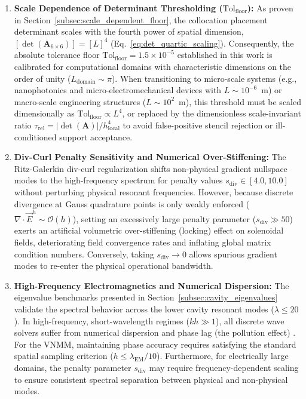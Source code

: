 \documentclass[preprint,12pt]{elsarticle}
\begin{document}
\begin{enumerate}
    \item \textbf{Scale Dependence of Determinant Thresholding ($\mathrm{Tol}_{\mathrm{floor}}$):} 
    As proven in Section~\ref{subsec:scale_dependent_floor}, the collocation placement determinant scales with the fourth power of spatial dimension, $[\det(\mathbf{A}_{6 \times 6})] = [L]^4$ (Eq.~\eqref{eq:det_quartic_scaling}). Consequently, the absolute tolerance floor $\mathrm{Tol}_{\mathrm{floor}} = 1.5 \times 10^{-5}$ established in this work is calibrated for computational domains with characteristic dimensions on the order of unity ($L_{\mathrm{domain}} \sim \pi$). When transitioning to micro-scale systems (e.g., nanophotonics and micro-electromechanical devices with $L \sim 10^{-6}$~m) or macro-scale engineering structures ($L \sim 10^2$~m), this threshold must be scaled dimensionally as $\mathrm{Tol}_{\mathrm{floor}} \propto L^4$, or replaced by the dimensionless scale-invariant ratio $\tau_{\mathrm{rel}} = |\det(\mathbf{A})| / h_{\mathrm{local}}^4$ to avoid false-positive stencil rejection or ill-conditioned support acceptance.

    \item \textbf{Div-Curl Penalty Sensitivity and Numerical Over-Stiffening:} 
    The Ritz-Galerkin div-curl regularization shifts non-physical gradient nullspace modes to the high-frequency spectrum for penalty values $s_{\mathrm{div}} \in [4.0, 10.0]$ without perturbing physical resonant frequencies. However, because discrete divergence at Gauss quadrature points is only weakly enforced ($\nabla \cdot \vec{E}^h \sim \mathcal{O}(h)$), setting an excessively large penalty parameter ($s_{\mathrm{div}} \gg 50$) exerts an artificial volumetric over-stiffening (locking) effect on solenoidal fields, deteriorating field convergence rates and inflating global matrix condition numbers. Conversely, taking $s_{\mathrm{div}} \to 0$ allows spurious gradient modes to re-enter the physical operational bandwidth.

    \item \textbf{High-Frequency Electromagnetics and Numerical Dispersion:} 
    The eigenvalue benchmarks presented in Section~\ref{subsec:cavity_eigenvalues} validate the spectral behavior across the lower cavity resonant modes ($\lambda \le 20$). In high-frequency, short-wavelength regimes ($kh \gg 1$), all discrete wave solvers suffer from numerical dispersion and phase lag (the pollution effect) \cite{jin2014finite, monk2003finite}. For the VNMM, maintaining phase accuracy requires satisfying the standard spatial sampling criterion ($h \le \lambda_{\mathrm{EM}} / 10$). Furthermore, for electrically large domains, the penalty parameter $s_{\mathrm{div}}$ may require frequency-dependent scaling to ensure consistent spectral separation between physical and non-physical modes.


\end{enumerate}
\end{document}
